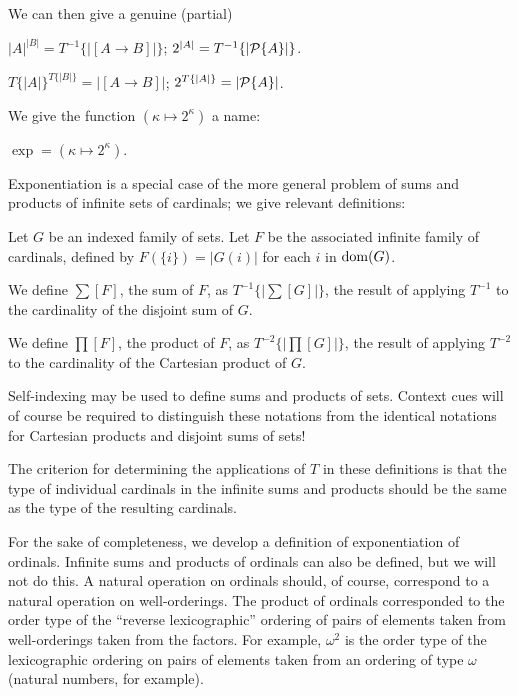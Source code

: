 We can then give a genuine (partial)

\begin{definition}
 $|A|^{|B|} = T^{-1}\{|[A \rightarrow  B]|\}$;
 $2^{|A|} = T^{-1}\{|{\cal P}\{A\}|\}$.
\end{definition}

\begin{cor}
 $T\{|A|\}^{T\{|B|\}} = |[A \rightarrow B]|$;
 $2^{T\{|A|\}} = |{\cal P}\{A\}|$.
\end{cor}

We give the function $(\kappa \mapsto  2^{\kappa})$ a name:
\begin{definition}
 $\exp = (\kappa \mapsto  2^{\kappa})$.
\end{definition}

Exponentiation is a special case of the more
general problem of sums and products of infinite sets of
cardinals; we give relevant definitions:

\begin{definition}
 
Let $G$ be an indexed family of sets.  Let $F$ be the associated
infinite family of cardinals, defined by $F(\{i\}) = |G(i)|$ for each
$i$ in $\mathop{\mathrm{dom}}(G)$.

 We define $\sum[F]$, the sum of
 $F$, as $T^{-1}\{|\sum[ G]|\}$, the result of applying $T^{-1}$ to the
 cardinality of the disjoint sum of $G$.

 We define $\prod[F]$, the product of $F$, as
 $T^{-2}\{|\prod[G]|\}$, the result of applying 
 $T^{-2}$ to the cardinality of the Cartesian product of $G$.

 Self-indexing may be used to define sums and products of sets.
 Context cues will of course be required to distinguish these
 notations from the identical notations for Cartesian
 products and disjoint sums of sets!
\end{definition}

The criterion for determining the applications of $T$ in these
definitions is that the type of individual
cardinals in the infinite sums and products
should be the same as the type of the resulting cardinals.

For the sake of completeness, we develop a definition of
exponentiation of ordinals.  Infinite sums and
products of ordinals
can also be defined, but we will not do this.  A natural operation on
ordinals should, of course, correspond to a natural operation on
well-orderings.  The product of ordinals corresponded to
the order type of the ``reverse lexicographic'' ordering of pairs of elements
taken from well-orderings taken from the factors.  For example, $\omega^2$ is
the order type of the lexicographic ordering on
pairs of elements taken from an ordering of type $\omega$
(natural numbers, for example).

